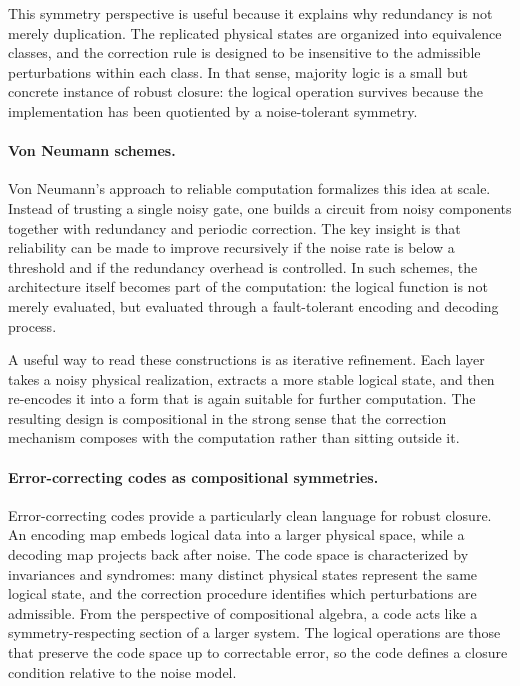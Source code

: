 \documentclass[11pt]{article}
\begin{document}
This symmetry perspective is useful because it explains why redundancy is not merely duplication. The replicated physical states are organized into equivalence classes, and the correction rule is designed to be insensitive to the admissible perturbations within each class. In that sense, majority logic is a small but concrete instance of robust closure: the logical operation survives because the implementation has been quotiented by a noise-tolerant symmetry.

\paragraph{Von Neumann schemes.}
Von Neumann's approach to reliable computation formalizes this idea at scale. Instead of trusting a single noisy gate, one builds a circuit from noisy components together with redundancy and periodic correction. The key insight is that reliability can be made to improve recursively if the noise rate is below a threshold and if the redundancy overhead is controlled. In such schemes, the architecture itself becomes part of the computation: the logical function is not merely evaluated, but evaluated through a fault-tolerant encoding and decoding process.

A useful way to read these constructions is as iterative refinement. Each layer takes a noisy physical realization, extracts a more stable logical state, and then re-encodes it into a form that is again suitable for further computation. The resulting design is compositional in the strong sense that the correction mechanism composes with the computation rather than sitting outside it.

\paragraph{Error-correcting codes as compositional symmetries.}
Error-correcting codes provide a particularly clean language for robust closure. An encoding map embeds logical data into a larger physical space, while a decoding map projects back after noise. The code space is characterized by invariances and syndromes: many distinct physical states represent the same logical state, and the correction procedure identifies which perturbations are admissible. From the perspective of compositional algebra, a code acts like a symmetry-respecting section of a larger system. The logical operations are those that preserve the code space up to correctable error, so the code defines a closure condition relative to the noise model.
\end{document}
